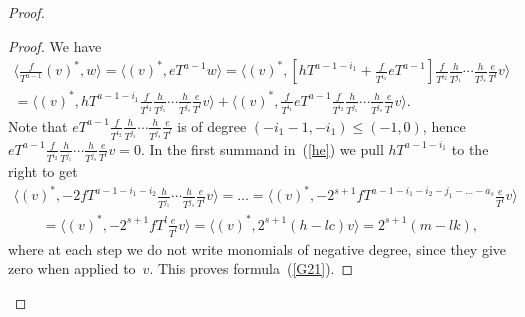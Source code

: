\begin{proof}
\begin{proof}We have
\begin{gather}
\bigg\langle \frac{f}{T^{a-1}} (v)^*, w \bigg\rangle = \big\langle (v)^*, eT^{a-1} w \big\rangle = \bigg\langle (v)^*, \left[ hT^{a-1-i_1} +
\frac{f}{T^{i_1}} eT^{a-1} \right]
 \frac{f}{T^{i_2}}\frac{h}{T^{j_1}} \cdots \frac{h}{T^{j_s}} \frac{e}{T^l}v \bigg\rangle \nonumber \\
{}= \bigg\langle (v)^*, hT^{a-1-i_1}
\frac{f}{T^{i_2}}\frac{h}{T^{j_1}} \cdots \frac{h}{T^{j_s}} \frac{e}{T^l}v \bigg\rangle +
\bigg\langle (v)^*, \frac{f}{T^{i_1}} eT^{a-1}
 \frac{f}{T^{i_2}}\frac{h}{T^{j_1}} \cdots \frac{h}{T^{j_s}} \frac{e}{T^l}v \bigg\rangle. \label{he}
\end{gather}
Note that $eT^{a-1} \frac{f}{T^{i_2}} \frac{h}{T^{j_1}} \cdots \frac{h}{T^{j_s}} \frac{e}{T^l}$ is of degree $(-i_1 - 1, -i_1) \leq (-1,0)$, hence \newline $eT^{a-1} \frac{f}{T^{i_2}} \frac{h}{T^{j_1}}\cdots\frac{h}{T^{j_s}} \frac{e}{T^{l}} v = 0$. In the first summand in~(\ref{he}) we pull $hT^{a-1-i_1}$ to the right to get
\begin{gather*}
\bigg\langle (v)^*, -2 fT^{a-1-i_1-i_2} \frac{h}{T^{j_1}} \cdots \frac{h}{T^{j_s}} \frac{e}{T^l}v \bigg\rangle = \dots = \bigg\langle (v)^*, -2^{s+1} fT^{a-1-i_1-i_2-j_1-\dots -a_s} \frac{e}{T^l}v \bigg\rangle \\
\qquad{} = \bigg\langle (v)^*, -2^{s+1} fT^{l} \frac{e}{T^l}v \bigg\rangle = \big\langle (v)^*, 2^{s+1} (h - lc) v \big\rangle = 2^{s+1} (m - lk),
\end{gather*}
where at each step we do not write monomials of negative degree, since they give zero when applied to~$v$. This proves formula~(\ref{G21}).


\end{proof}
\end{proof}
